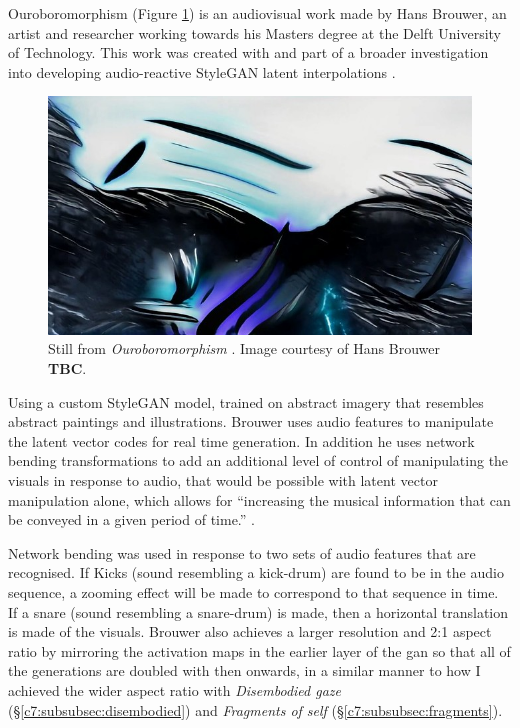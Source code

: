 Ouroboromorphism \citep{brouwer2020ourobo} (Figure \ref{fig:c7:ouroboromorphism}) is an audiovisual work made by Hans Brouwer, an artist and researcher working towards his Masters degree at the Delft University of Technology. 
This work was created with and part of a broader investigation into developing audio-reactive StyleGAN latent interpolations \citep{brouwer2020audio}. 

\begin{figure}[!htb]
    \centering
    \captionsetup{justification=centering}
    \includegraphics[width=1\textwidth]{figures/c7_impact/other-artworks/Ouroboromorphism.png}
    \caption[Still from \textit{Ouroboromorphism}]{Still from \textit{Ouroboromorphism} \citep{brouwer2020ourobo}. Image courtesy of Hans Brouwer \textbf{TBC}.}
    \label{fig:c7:ouroboromorphism}
\end{figure}


Using a custom StyleGAN model, trained on abstract imagery that resembles abstract paintings and illustrations.
 Brouwer uses audio features to manipulate the latent vector codes for real time generation. 
 In addition he uses network bending transformations to add an additional level of control of manipulating the visuals in response to audio, that would be possible with latent vector manipulation alone, which allows for “increasing the musical information that can be conveyed in a given period of time.” \citep{brouwer2020audio}. 

Network bending was used in response to two sets of audio features that are recognised.
If Kicks (sound resembling a kick-drum) are found to be in the audio sequence, a zooming effect will be made to correspond to that sequence in time. If a snare (sound resembling a snare-drum) is made, then a horizontal translation is made of the visuals. 
Brouwer also achieves a larger resolution and 2:1 aspect ratio by mirroring the activation maps in the earlier layer of the gan so that all of the generations are doubled with then onwards, in a similar manner to how I achieved the wider aspect ratio with \textit{Disembodied gaze} (\S \ref{c7:subsubsec:disembodied}) and \textit{Fragments of self} (\S \ref{c7:subsubsec:fragments}). 

